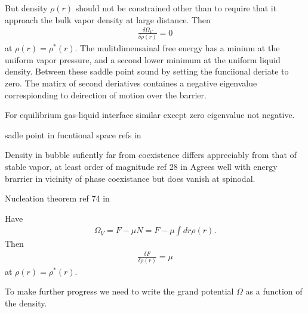 But density $\rho(r)$ should not be constrained other than to require that it approach the bulk vapor density at large distance.
Then 
\begin{align}
  \frac{\delta \Omega_V}{\delta \rho(r)} = 0
\end{align}
at $\rho(r) = \rho^\ast(r)$.
The mulitdimensainal free energy has a minium at the uniform vapor pressure,
and a second lower minimum at the  uniform liquid density. Between these saddle point sound by setting the funciional deriate to zero.
The matirx of second deriatives containes a negative eigenvalue correspionding to deirection of motion over the barrier.

For equilibrium gas-liquid interface similar except zero eigenvalue not negative. 

sadle point in fucntional space refs in \cite{shen2003}

Density in bubble sufiently far from coexistence differs appreciably from that of stable vapor,
at least order of magnitude ref 28 in \cite{Shen2003}
Agrees well with energy brarrier in vicinity of phase coexistance but does vanish at spinodal.

Nucleation theorem ref 74 in \cite{shen2003}

Have
\begin{align}
\Omega_V = F - \mu N = F - \mu \int dr \rho(r).
\end{align}
Then \begin{align}
\frac{\delta F}{\delta \rho(r)} = \mu
\end{align}
at $\rho(r) = \rho^\ast(r)$.


To make further progress we need to write the grand potential $\Omega$ as a function of the density.

